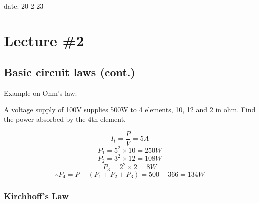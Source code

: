 \documentclass[11pt]{article}
\author{Yahia Gaber}
\date{\today}
\title{}
\begin{document}
\tableofcontents

date: 20-2-23
\section{Lecture \#2}
\label{sec:org65ce475}

\subsection{Basic circuit laws (cont.)}
\label{sec:orgaf6eb8c}

Example on Ohm's law:

A voltage supply of 100V supplies 500W to 4 elements, 10, 12 and 2 in ohm.
Find the power absorbed by the 4th element.

$$I_t = \frac{P}{V} = 5A$$
$$P_1 = 5^2 \times 10 = 250W$$
$$P_2 = 3^2 \times 12 = 108W$$
$$P_3 = 2^2 \times 2 = 8W$$
$$\therefore P_4 = P - (P_1 + P_2 + P_3) = 500 - 366 = 134W$$
\subsubsection{Kirchhoff's Law}
\label{sec:org9e7a8ab}
\end{document}
